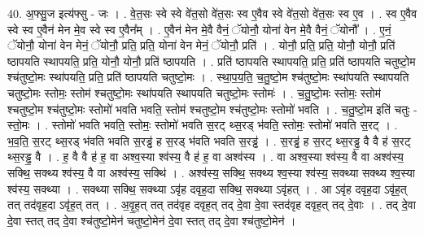 \documentclass[17pt]{extarticle}
\begin{document}
40. अ॒फ्सु॒ज इत्य॑फ्सु - जः । . वे॒त॒सः स्वे स्वे वे॑त॒सो वे॑त॒सः स्व ए॒वैव स्वे वे॑त॒सो वे॑त॒सः स्व ए॒व । . स्व ए॒वैव स्वे स्व ए॒वैन॑ मेन मे॒व स्वे स्व ए॒वैन᳚म् । . ए॒वैन॑ मेन मे॒वै वैनं॒ ॅयोनौ॒ योना॑ वेन मे॒वै वैनं॒ ॅयोनौ᳚ । . ए॒नं॒ ॅयोनौ॒ योना॑ वेन मेनं॒ ॅयोनौ॒ प्रति॒ प्रति॒ योना॑ वेन मेनं॒ ॅयोनौ॒ प्रति॑ । . योनौ॒ प्रति॒ प्रति॒ योनौ॒ योनौ॒ प्रति॑ ष्ठापयति स्थापयति॒ प्रति॒ योनौ॒ योनौ॒ प्रति॑ ष्ठापयति । . प्रति॑ ष्ठापयति स्थापयति॒ प्रति॒ प्रति॑ ष्ठापयति चतुष्टो॒म श्च॑तुष्टो॒मः स्था॑पयति॒ प्रति॒ प्रति॑ ष्ठापयति चतुष्टो॒मः । . स्था॒प॒य॒ति॒ च॒तु॒ष्टो॒म श्च॑तुष्टो॒मः स्था॑पयति स्थापयति चतुष्टो॒मः स्तोमः॒ स्तोम॑ श्चतुष्टो॒मः स्था॑पयति स्थापयति चतुष्टो॒मः स्तोमः॑ । . च॒तु॒ष्टो॒मः स्तोमः॒ स्तोम॑ श्चतुष्टो॒म श्च॑तुष्टो॒मः स्तोमो॑ भवति भवति॒ स्तोम॑ श्चतुष्टो॒म श्च॑तुष्टो॒मः स्तोमो॑ भवति । . च॒तु॒ष्टो॒म इति॑ चतुः - स्तो॒मः । . स्तोमो॑ भवति भवति॒ स्तोमः॒ स्तोमो॑ भवति स॒रट् थ्स॒रड् भ॑वति॒ स्तोमः॒ स्तोमो॑ भवति स॒रट् । . भ॒व॒ति॒ स॒रट् थ्स॒रड् भ॑वति भवति स॒रड्ढ॑ ह स॒रड् भ॑वति भवति स॒रड्ढ॑ । . स॒रड्ढ॑ ह स॒रट् थ्स॒रड्ढ॒ वै वै ह॑ स॒रट् थ्स॒रड्ढ॒ वै । . ह॒ वै वै ह॑ ह॒ वा अश्व॒स्या श्व॑स्य॒ वै ह॑ ह॒ वा अश्व॑स्य । . वा अश्व॒स्या श्व॑स्य॒ वै वा अश्व॑स्य॒ सक्थि॒ सक्थ्य श्व॑स्य॒ वै वा अश्व॑स्य॒ सक्थि॑ । . अश्व॑स्य॒ सक्थि॒ सक्थ्य श्व॒स्या श्व॑स्य॒ सक्थ्या सक्थ्य श्व॒स्या श्व॑स्य॒ सक्थ्या । . सक्थ्या सक्थि॒ सक्थ्या ऽवृ॑ह दवृह॒दा सक्थि॒ सक्थ्या ऽवृ॑हत् । . आ ऽवृ॑ह दवृह॒दा ऽवृ॑ह॒त् तत् तद॑वृह॒दा ऽवृ॑ह॒त् तत् । . अ॒वृ॒ह॒त् तत् तद॑वृह दवृह॒त् तद् दे॒वा दे॒वा स्तद॑वृह दवृह॒त् तद् दे॒वाः । . तद् दे॒वा दे॒वा स्तत् तद् दे॒वा श्च॑तुष्टो॒मेन॑ चतुष्टो॒मेन॑ दे॒वा स्तत् तद् दे॒वा श्च॑तुष्टो॒मेन॑ । \newline
\end{document}

